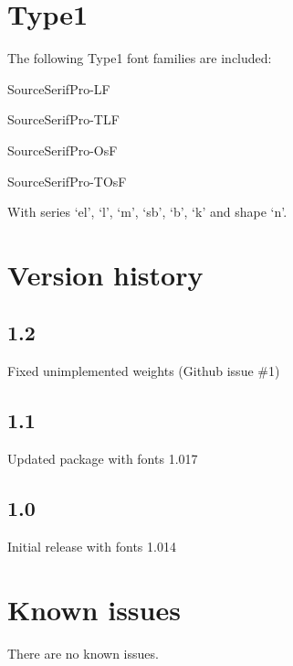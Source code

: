 \documentclass[10pt,a4paper,english]{article}
\begin{document}
\begin{multicols}{2}
\section{Type1}
The following Type1 font families are included:
\begin{itemize*}
	\item SourceSerifPro-LF
	\item SourceSerifPro-TLF
	\item SourceSerifPro-OsF
	\item SourceSerifPro-TOsF
\end{itemize*}
With series ‘el’, ‘l’, ‘m’, ‘sb’, ‘b’, ‘k’ and shape ‘n’.

\section{Version history}
\subsection*{1.2}
\begin{itemize*}
	\item Fixed unimplemented weights (Github issue \#1)
\end{itemize*}

\subsection*{1.1}
\begin{itemize*}
	\item Updated package with fonts 1.017
\end{itemize*}

\subsection*{1.0}
\begin{itemize*}
	\item Initial release with fonts 1.014
\end{itemize*}

\section{Known issues}
\begin{itemize*}
	\item There are no known issues.
\end{itemize*}
\vspace{0pt plus 1filll}\mbox{}
\newpage
\end{multicols}
\end{document}
